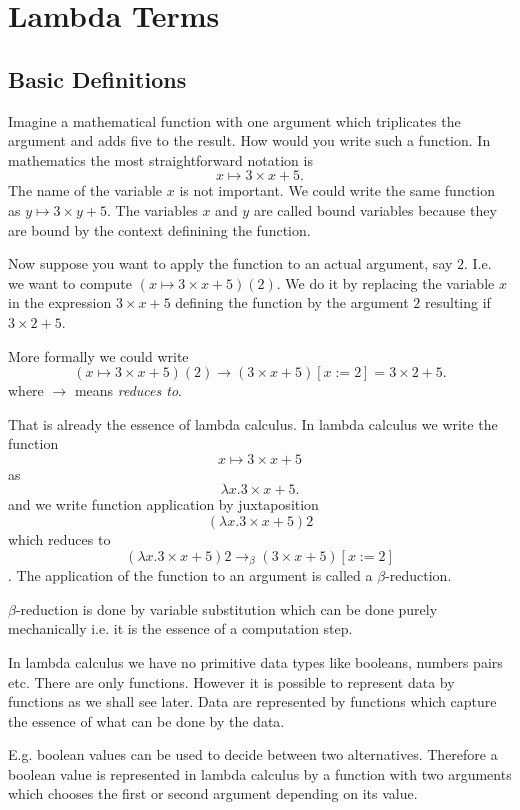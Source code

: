 \section{Lambda Terms}
\label{sec:lambda}

\subsection{Basic Definitions}

Imagine a mathematical function with one argument which triplicates the
argument and adds five to the result. How would you write such a function. In
mathematics the most straightforward notation is
$$ x \mapsto 3 \times x + 5.$$
%
The name of the variable $x$ is not important. We could write the same
function as $y \mapsto 3\times y + 5$. The variables $x$ and $y$ are called bound
variables because they are bound by the context definining the function.

Now suppose you want to apply the function to an actual argument, say
$2$. I.e. we want to compute $(x \mapsto 3\times x + 5)(2)$. We do it by
replacing the variable $x$ in the expression $3\times x + 5$ defining the
function by the argument $2$ resulting if $3\times 2 + 5$.

More formally we could write
$$ (x \mapsto 3 \times x + 5)(2) \to (3 \times x + 5)[x:=2] = 3\times 2 + 5.$$
where $\to$ means \emph{reduces to}.

That is already the essence of lambda calculus. In lambda calculus we write
the function $$x \mapsto 3 \times x + 5$$ as $$\lambda x. 3 \times x + 5.$$
and we write function application by juxtaposition
$$ (\lambda x. 3\times x + 5) 2$$
which reduces to
$$ (\lambda x. 3\times x + 5) 2 \to_\beta (3 \times x + 5)[x:=2]$$.
The application of the function to an argument is called a $\beta$-reduction.

$\beta$-reduction is done by variable substitution which can be done purely
mechanically i.e. it is the essence of a computation step.

In lambda calculus we have no primitive data types like booleans, numbers
pairs etc. There are only functions. However it is possible to represent data
by functions as we shall see later. Data are represented by functions which
capture the essence of what can be done by the data.

E.g. boolean values can be used to decide between two alternatives. Therefore
a boolean value is represented in lambda calculus by a function with two
arguments which chooses the first or second argument depending on its value.

